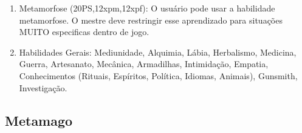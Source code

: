 \begin{enumerate}
		\item Metamorfose (20PS,12xpm,12xpf): O usuário pode usar a habilidade metamorfose. O mestre deve restringir esse aprendizado para situações MUITO especificas dentro de jogo.

	
	\item Habilidades Gerais: Mediunidade, Alquimia, Lábia, Herbalismo, Medicina, Guerra, Artesanato, Mecânica, Armadilhas, Intimidação, Empatia, Conhecimentos (Rituais, Espíritos, Política, Idiomas, Animais), Gunsmith, Investigação.
\end{enumerate}


\subsection{Metamago}
  
